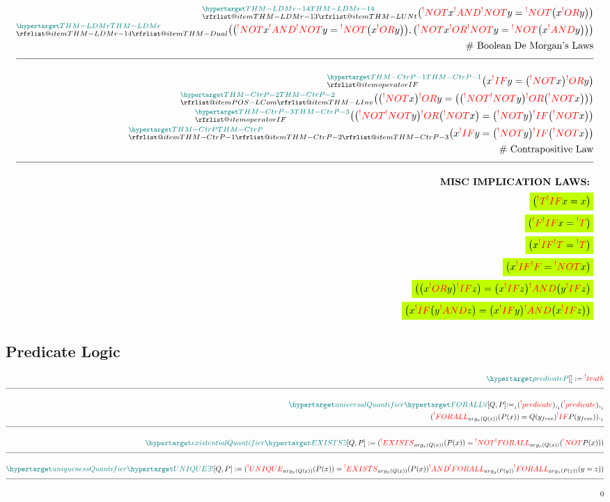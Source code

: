 \documentclass[a4paper]{article}
\makeatletter
\def\ml{\mleft}
\def\mr{\mright}
\newcommand{\tdb}[1]{\colorbox{lime}{$\displaystyle #1$}}
\newcommand{\defeq}{:=}
\newcommand{\eq}{=}
\newcommand{\cusand}{,}
\newcommand{\cuspop}[2]{arg_{#1}(#2)}
\newcommand{\cusend}{.}
\newcommand{\free}[1]{{#1}_{free}}
\newcommand{\cusnum}[2]{{#1}_{{\phantom{ }}_{#2}}}
\newcommand{\eqComment}[1]{\text{  \# #1}}
\newcommand{\n}{\\[1.5ex] \hline \nonumber \\[0ex]}
\newcommand{\m}{\nonumber \\}
\newcommand\rfrlist[1]{%
    \forcsvlist{\rfrlist@item}{#1}
}
\newcommand\rfrlist@item[1]{\rfr{#1}\\}
\newcommand{\thmlink}[2]{{}_{\substack{\rfrlist{#1}}}^{\dfn{#2}} }
\makeatother
\begin{document}
\begin{tcolorbox}
\begin{align}
\m \thmlink{THM-LDMr-13, THM-LUNt}{THM-LDMr-14} \ml(\rfr{NOT} x \rfr{AND} \rfr{NOT} y \eq \rfr{NOT} \ml(x \rfr{OR} y\mr)\mr) 
\m \thmlink{THM-LDMr-14, THM-Dual}{THM-LDMr} \ml(\ml(\rfr{NOT} x \rfr{AND} \rfr{NOT} y \eq \rfr{NOT} \ml(x \rfr{OR} y\mr)\mr) \cusand \ml(\rfr{NOT} x \rfr{OR} \rfr{NOT} y \eq \rfr{NOT} \ml(x \rfr{AND} y\mr)\mr)\mr) 
\m \eqComment{Boolean De Morgan's Laws}
    \n \thmlink{operatorIF}{THM-CtrP-1} \ml(x \rfr{IF} y \eq \ml(\rfr{NOT} x\mr) \rfr{OR} y\mr)  
\m \thmlink{POS-LCom, THM-LInv}{THM-CtrP-2} \ml(\ml(\rfr{NOT} x\mr) \rfr{OR} y \eq \ml(\ml(\rfr{NOT} \rfr{NOT} y\mr) \rfr{OR} \ml(\rfr{NOT} x\mr)\mr)\mr)  
\m \thmlink{operatorIF}{THM-CtrP-3} \ml(\ml(\rfr{NOT} \rfr{NOT} y\mr) \rfr{OR} \ml(\rfr{NOT} x\mr) \eq \ml(\rfr{NOT} y\mr) \rfr{IF} \ml(\rfr{NOT} x\mr)\mr)  
\m \thmlink{THM-CtrP-1, THM-CtrP-2, THM-CtrP-3}{THM-CtrP} \ml(x \rfr{IF} y \eq \ml(\rfr{NOT} y\mr) \rfr{IF} \ml(\rfr{NOT} x\mr)\mr) 
\m \eqComment{Contrapositive Law} 
    \n \textbf{MISC IMPLICATION LAWS: } %
\m \tdb{\ml(\rfr{T} \rfr{IF} x \eq x\mr)}
\m \tdb{\ml(\rfr{F} \rfr{IF} x \eq \rfr{T}\mr)}
\m \tdb{\ml(x \rfr{IF} \rfr{T} \eq \rfr{T}\mr)}
\m \tdb{\ml(x \rfr{IF} \rfr{F} \eq \rfr{NOT} x\mr)}  
\m \tdb{\ml(\ml(x \rfr{OR} y\mr) \rfr{IF} z\mr) \eq \ml(x \rfr{IF} z\mr) \rfr{AND} \ml(y \rfr{IF} z\mr)}
\m \tdb{\ml(x \rfr{IF} \ml(y \rfr{AND} z\mr) \eq \ml(x \rfr{IF} y\mr) \rfr{AND} \ml(x \rfr{IF} z\mr)\mr)} 
\end{align}
\end{tcolorbox}


\subsection{Predicate Logic}
\begin{tcolorbox}
\begin{align}
    \dfn{predicate} [P][] \defeq \rfr{truth} [P(\free{v})][] 
    \n \dfn{universalQuantifier} [\dfn{FORALL}[\forall]][Q, P] \cusnum{\defeq}{1} (\rfr{predicate} [Q][]) \cusnum{\cusand}{1} (\rfr{predicate} [P][]) \cusnum{\cusand}{1} 
\m (\rfr{FORALL}_{\cuspop{x}{Q(x)}} (P(x)) \eq Q(\free{y}) \rfr{IF} P(\free{y})) \cusnum{\cusend}{1}
    \n \dfn{existentialQuantifier} [\dfn{EXISTS}[\exists]][Q, P] \defeq (\rfr{EXISTS}_{\cuspop{x}{Q(x)}} (P(x)) \eq \rfr{NOT} \rfr{FORALL}_{\cuspop{x}{Q(x)}} (\rfr{NOT} P(x)))
    \n \dfn{uniquenessQuantifier} [\dfn{UNIQUE}[\exists!]][Q, P] \defeq (\rfr{UNIQUE}_{\cuspop{x}{Q(x)}} (P(x)) \eq \rfr{EXISTS}_{\cuspop{x}{Q(x)}} (P(x)) \rfr{AND} \rfr{FORALL}_{\cuspop{y}{P(y)}} \rfr{FORALL}_{\cuspop{z}{P(z)}} (y = z))
    \n 0
\end{align}
\end{tcolorbox}
\end{document}
